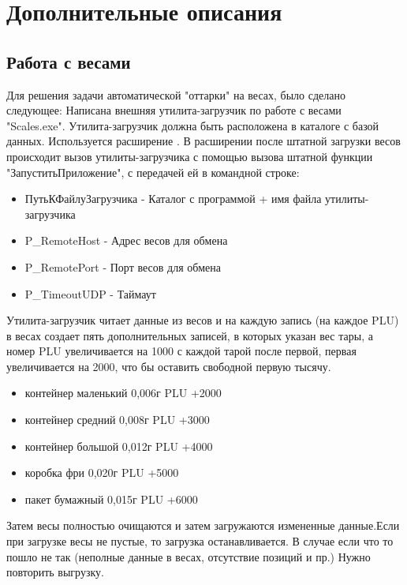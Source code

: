 \section{Дополнительные описания}

\subsection{Работа с весами}\label{1001}

Для решения задачи автоматической "оттарки" на весах, было сделано следующее:
Написана внешняя утилита-загрузчик по работе с весами "Scales.exe". Утилита-загрузчик должна быть расположена в каталоге с базой данных.
Используется расширение .
В расширении после штатной загрузки весов происходит вызов  утилиты-загрузчика с помощью вызова штатной функции "ЗапуститьПриложение", с передачей ей в командной строке:


\begin{itemize}
	\item ПутьКФайлуЗагрузчика - Каталог с программой + имя файла утилиты-загрузчика
	\item P\_RemoteHost - Адрес весов для обмена
	\item P\_RemotePort - Порт весов для обмена
	\item P\_TimeoutUDP - Таймаут 			 
\end{itemize}

Утилита-загрузчик читает данные из весов и на каждую запись (на каждое PLU) в весах создает пять дополнительных записей, в которых указан вес тары, а номер PLU увеличивается на 1000 с каждой тарой после первой, первая увеличивается на 2000, что бы оставить свободной первую тысячу. 

\begin{itemize}
	\item контейнер маленький  0,006г PLU +2000
	\item контейнер средний    0,008г PLU +3000
	\item контейнер большой    0,012г PLU +4000	
	\item коробка фри          0,020г PLU +5000
	\item пакет бумажный       0,015г PLU +6000	 
\end{itemize}
 Затем весы полностью очищаются и затем загружаются измененные данные.Если при загрузке весы не пустые, то загрузка останавливается.
 В случае если что то пошло не так (неполные данные в весах, отсутствие позиций и пр.) Нужно повторить выгрузку.
 
